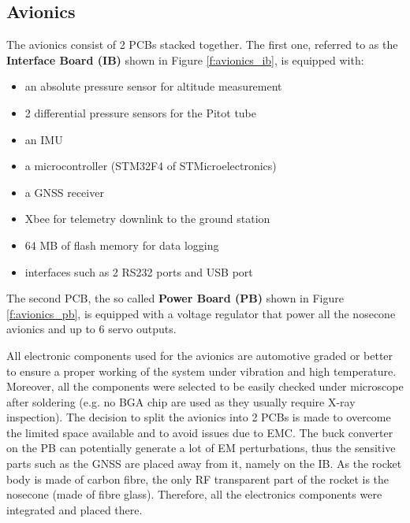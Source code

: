  
\subsection{Avionics}
The avionics consist of 2 PCBs stacked together. The first one, referred to as the \textbf{Interface Board (IB)} shown in Figure \ref{f:avionics_ib}, is equipped with:
\begin{itemize}[noitemsep]
    \item an absolute pressure sensor for altitude measurement
    \item 2 differential pressure sensors for the Pitot tube
    \item an IMU
    \item a microcontroller (STM32F4 of STMicroelectronics)
    \item a GNSS receiver
    \item Xbee for telemetry downlink to the ground station
    \item 64 MB of flash memory for data logging
    \item interfaces such as 2 RS232 ports and USB port
\end{itemize}

The second PCB, the so called \textbf{Power Board (PB)}  shown in Figure \ref{f:avionics_pb}, is equipped with a voltage regulator that power all the nosecone avionics and up to 6 servo outputs.

All electronic components used for the avionics are automotive graded or better to ensure a proper working of the system under vibration and high temperature. Moreover, all the components were selected to be easily checked under microscope after soldering (e.g. no BGA chip are used as they usually require X-ray inspection).
The decision to split the avionics into 2 PCBs is made to overcome the limited space available and to avoid issues due to EMC. The buck converter on the PB can potentially generate a lot of EM perturbations, thus the sensitive parts such as the GNSS are placed away from it, namely on the IB.
As the rocket body is made of carbon fibre, the only RF transparent part of the rocket is the nosecone (made of fibre glass). Therefore, all the electronics components were integrated and placed there.

